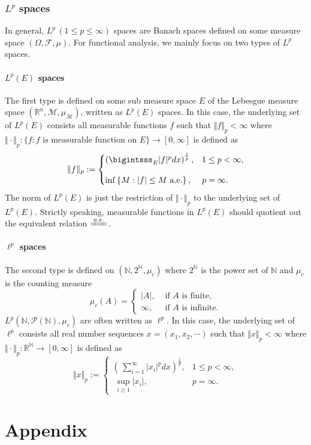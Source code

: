 \documentclass{report}
\theoremstyle{nonumberplain}
\begin{document}
\subsection{$L^p$ spaces}
In general, $L^p\,(1\le p\le\infty)$ spaces are Banach spaces defined on some measure space $(\Omega, \mathcal{F}, \mu)$. For functional analysis, we mainly focus on two types of $L^p$ spaces. 
\subsubsection{$L^p(E)$ spaces}
The first type is defined on some sub measure space $E$ of the Lebesgue measure space $(\mathbb{R}^n, \mathcal{M}, \mu_{\mathcal{M}})$, written as $L^p(E)$ spaces. In this case, the underlying set of $L^p(E)$ consists all measurable functions $f$ such that $\Vert f\Vert_p <\infty$ where $\Vert \cdot\Vert_p:\{f:f\text{ is measurable function on }E\}\to[0,\infty]$ is defined as
\[
	\Vert f\Vert_p:=
	\begin{cases}
		\left(\bigintsss_E |f|^pdx\right)^{\frac{1}{p}},&1\le p< \infty,\\[10pt]
		\inf \left\{M: |f|\le M\text{ a.e.}\right\},&p=\infty.
	\end{cases}	
\]
The norm of $L^p(E)$ is just the restriction of $\Vert \cdot\Vert_p$ to the underlying set of $L^p(E)$. Strictly speaking, measurable functions in $L^p(E)$ should quotient out the equivalent relation $\xlongequal{a.e.}$.
\subsubsection{$\ell^p$ spaces}
The second type is defined on $(\mathbb{N},2^\mathbb{N},\mu_c)$ where $2^\mathbb{N}$ is the power set of $\mathbb{N}$ and $\mu_c$ is the counting measure
\[
\mu_c(A)= 
\begin{cases}
	|A|, & \text { if } A \text { is finite}, \\
	\infty, & \text { if } A \text { is infinite}.
\end{cases}
\]
$L^p(\mathbb{N},\mathcal{P}(\mathbb{N}),\mu_c)$ are often written as $\ell^p$. In this case, the underlying set of $\ell^p$ consists all real number sequences $x=(x_1,x_2,\cdots)$ such that $\Vert x\Vert_p <\infty$ where $\Vert \cdot\Vert_p:\mathbb{R}^\mathbb{N}\to[0,\infty]$ is defined as
\[
	\Vert x\Vert_p:=
	\begin{cases}
		\left(\,\sum\limits_{i=1}^\infty |x_i|^pdx\right)^{\frac{1}{p}},&1\le p< \infty,\\[10pt]
		\;\sup\limits_{i\ge 1}|x_i|,&p=\infty.
	\end{cases}	
\]

\chapter*{Appendix}
\end{document}
